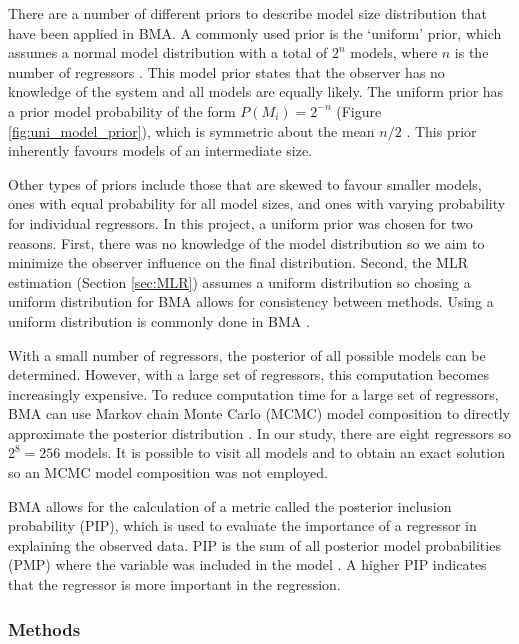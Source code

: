 \documentclass[12pt]{article}
\begin{document}
There are a number of different priors to describe model size distribution that have been applied in BMA. A commonly used prior is the `uniform' prior, which assumes a normal model distribution with a total of $2^n$ models, where $n$ is the number of regressors \citep{Wasserman2000}.  This model prior states that the observer has no knowledge of the system and all models are equally likely. The uniform prior has a prior model probability of the form $P(M_i)=2^{-n}$ (Figure \ref{fig:uni_model_prior}), which is symmetric about the mean $n/2$ \citep{Zeugner2015}. This prior inherently favours models of an intermediate size. 

Other types of priors include those that are skewed to favour smaller models, ones with equal probability for all model sizes, and ones with varying probability for individual regressors. In this project, a uniform prior was chosen for two reasons. First, there was no knowledge of the model distribution so we aim to minimize the observer influence on the final distribution. Second, the MLR estimation (Section \ref{sec:MLR}) assumes a uniform distribution so chosing a uniform distribution for BMA allows for consistency between methods. Using a uniform distribution is commonly done in BMA \citep{Wasserman2000}.

With a small number of regressors, the posterior of all possible models can be determined. However, with a large set of regressors, this computation becomes increasingly expensive. To reduce computation time for a large set of regressors, BMA can use Markov chain Monte Carlo (MCMC) model composition to directly approximate the posterior distribution \citep{Wasserman2000}. In our study, there are eight regressors so $2^8 = 256$ models. It is possible to visit all models and to obtain an exact solution so an MCMC model composition was not employed. 

BMA allows for the calculation of a metric called the posterior inclusion probability (PIP), which is used to evaluate the importance of a regressor in explaining the observed data. PIP is the sum of all posterior model probabilities (PMP) where the variable was included in the model \citep{Zeugner2015}. A higher PIP indicates that the regressor is more important in the regression.  

\subsubsection{Methods}
\end{document}
